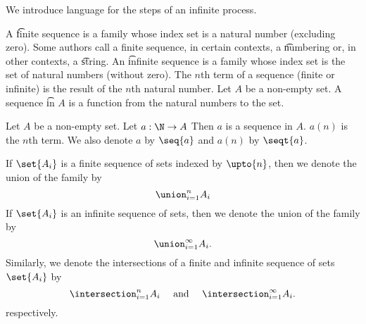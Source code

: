

We introduce language for the steps of an infinite process.


A \t{finite sequence} is a family whose index set is a natural number (excluding zero).
Some authors call a finite sequence, in certain contexts, a \t{numbering} or, in other contexts, a \t{string}.
An \t{infinite sequence} is a family whose index set is the set of natural numbers (without zero).
The \t{$n$th term} of a sequence (finite or infinite) is the result of the $n$th natural number.
Let $A$ be a non-empty set.
A sequence \t{in} $A$ is a function from the natural numbers to the set.


Let $A$ be a non-empty set.
Let $a: \N \to A$
Then $a$ is a sequence in $A$.
$a(n)$ is the $n$th term.
We also denote $a$ by
$\seq{a}$ and $a(n)$ by $\seqt{a}$.



If $\set{A_i}$ is a finite sequence of sets indexed by $\upto{n}$, then we denote the union of the family by
\[
  \union_{i = 1}^{n} A_i
\]
If $\set{A_i}$ is an infinite sequence of sets, then we denote the union of the family by
\[
  \union_{i = 1}^{\infty} A_i.
\]
Similarly, we denote the intersections of a finite and infinite sequence of sets $\set{A_i}$ by
\[
  \intersection_{i = 1}^{n} A_i \quad \text{ and } \quad \intersection_{i = 1}^{\infty} A_i.
\]
respectively.


%



%
%
%
%
%
